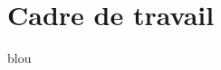 \documentclass[12pt,space=onehalf,version=final]{yathesis}
\begin{document}
%
\section{Cadre de travail}\label{sec-cadre}
%
blou
\end{document}
